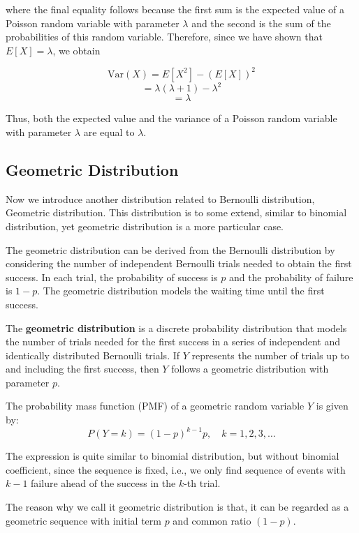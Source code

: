 where the final equality follows because the first sum is the expected value of a Poisson random variable with parameter \(\lambda\) and the second is the sum of the probabilities of this random variable. Therefore, since we have shown that \(E[X] = \lambda\), we obtain

\[
\text{Var}(X) = E[X^2] - (E[X])^2
\]
\[
= \lambda (\lambda + 1) - \lambda^2
\]
\[
= \lambda
\]

Thus, both the expected value and the variance of a Poisson random variable with parameter \(\lambda\) are equal to \(\lambda\).



\subsection{Geometric Distribution}
Now we introduce another distribution related to Bernoulli distribution, Geometric distribution. This distribution is to some extend, similar to binomial distribution, yet geometric distribution is a more particular case.

The geometric distribution can be derived from the Bernoulli distribution by considering the number of independent Bernoulli trials needed to obtain the first success. In each trial, the probability of success is \( p \) and the probability of failure is \( 1 - p \). The geometric distribution models the waiting time until the first success.

\begin{definition}
    The \textbf{geometric distribution} is a discrete probability distribution that models the number of trials needed for the first success in a series of independent and identically distributed Bernoulli trials. If \( Y \) represents the number of trials up to and including the first success, then \( Y \) follows a geometric distribution with parameter \( p \).

The probability mass function (PMF) of a geometric random variable \( Y \) is given by:
\[
P(Y = k) = (1 - p)^{k-1} p, \quad k = 1, 2, 3, \ldots
\]
\end{definition}

The expression is quite similar to binomial distribution, but without binomial coefficient, since the sequence is fixed, i.e., we only find sequence of events with $k-1$ failure ahead of the success in the $k$-th trial.

The reason why we call it geometric distribution is that, it can be regarded as a geometric sequence with initial term $p$ and common ratio $(1-p)$. 

